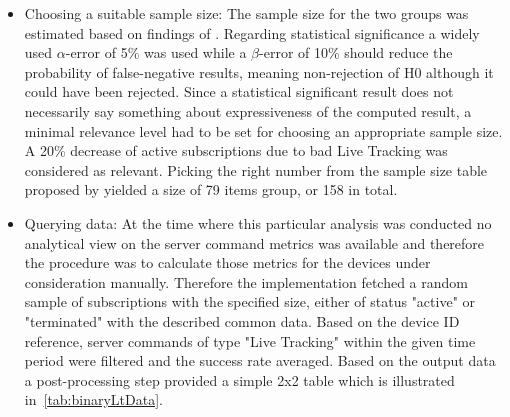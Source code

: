 \begin{enumerate}
\begin{itemize}
		\item Choosing a suitable sample size: The sample size for the two groups was estimated based on findings of \cite{campbell1995estimating}. Regarding statistical significance a widely used $\alpha$-error of 5\% was used while a $\beta$-error of 10\% should reduce the probability of false-negative results, meaning non-rejection of H0 although it could have been rejected. Since a statistical significant result does not necessarily say something about expressiveness of the computed result, a minimal relevance level had to be set for choosing an appropriate sample size. A 20\% decrease of active subscriptions due to bad Live Tracking was considered as relevant. Picking the right number from the sample size table proposed by \cite{campbell1995estimating} yielded a size of 79 items group, or 158 in total. 
		\item Querying data: At the time where this particular analysis was conducted no analytical view on the server command metrics was available and therefore the procedure was to calculate those metrics for the devices under consideration manually. Therefore the implementation fetched a random sample of subscriptions with the specified size, either of status "active" or "terminated" with the described common data. Based on the device ID reference, server commands of type "Live Tracking" within the given time period were filtered and the success rate averaged. Based on the output data a post-processing step provided a simple 2x2 table which is illustrated in~\ref{tab:binaryLtData}. 
		

\end{itemize}
\end{enumerate}
